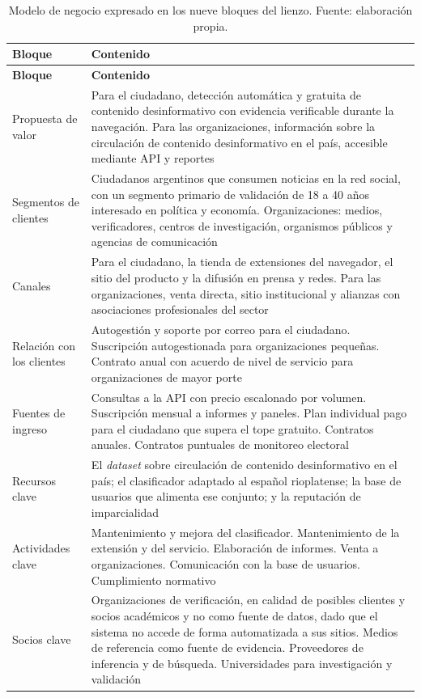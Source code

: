 \begin{small}
\begin{longtable}{@{}p{3.2cm} p{11cm}@{}}
  \caption{Modelo de negocio expresado en los nueve bloques del lienzo. Fuente: elaboración propia.}
  \label{tab:bmc} \\
  \hline
  \textbf{Bloque} & \textbf{Contenido} \\
  \hline
  \endfirsthead
  \hline
  \textbf{Bloque} & \textbf{Contenido} \\
  \hline
  \endhead
  \hline
  \endfoot
  Propuesta de valor & Para el ciudadano, detección automática y gratuita de contenido desinformativo con evidencia verificable durante la navegación. Para las organizaciones, información sobre la circulación de contenido desinformativo en el país, accesible mediante API y reportes \\
  Segmentos de clientes & Ciudadanos argentinos que consumen noticias en la red social, con un segmento primario de validación de 18 a 40 años interesado en política y economía. Organizaciones: medios, verificadores, centros de investigación, organismos públicos y agencias de comunicación \\
  Canales & Para el ciudadano, la tienda de extensiones del navegador, el sitio del producto y la difusión en prensa y redes. Para las organizaciones, venta directa, sitio institucional y alianzas con asociaciones profesionales del sector \\
  Relación con los clientes & Autogestión y soporte por correo para el ciudadano. Suscripción autogestionada para organizaciones pequeñas. Contrato anual con acuerdo de nivel de servicio para organizaciones de mayor porte \\
  Fuentes de ingreso & Consultas a la API con precio escalonado por volumen. Suscripción mensual a informes y paneles. Plan individual pago para el ciudadano que supera el tope gratuito. Contratos anuales. Contratos puntuales de monitoreo electoral \\
  Recursos clave & El \textit{dataset} sobre circulación de contenido desinformativo en el país; el clasificador adaptado al español rioplatense; la base de usuarios que alimenta ese conjunto; y la reputación de imparcialidad \\
  Actividades clave & Mantenimiento y mejora del clasificador. Mantenimiento de la extensión y del servicio. Elaboración de informes. Venta a organizaciones. Comunicación con la base de usuarios. Cumplimiento normativo \\
  Socios clave & Organizaciones de verificación, en calidad de posibles clientes y socios académicos y no como fuente de datos, dado que el sistema no accede de forma automatizada a sus sitios. Medios de referencia como fuente de evidencia. Proveedores de inferencia y de búsqueda. Universidades para investigación y validación \\

\end{longtable}
\end{small}
